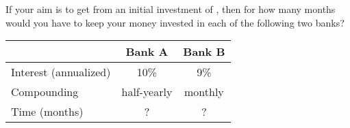 
%
%
%
%
% 

\question[3] If your aim is to get  from an initial investment 
of , then for how many months would you have to keep
your money invested in each of the following two banks?
\begin{table}
	\begin{tabular}{lcc}
		\toprule
		& Bank A & Bank B \\
		\midrule
		Interest (annualized) & 10\% & 9\% \\
		Compounding & half-yearly & monthly \\
		Time (months) & ? & ? \\
		\bottomrule
	\end{tabular}
\end{table}

\ifprintanswers
\fi 

